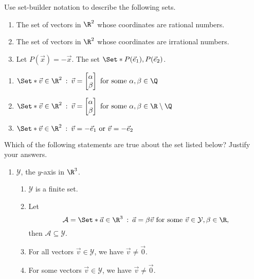 \begin{exercises}
\begin{problist}
		\prob
		Use set-builder notation to describe the following sets.
		\begin{enumerate}
			\item The set of vectors in $\R^{2}$ whose coordinates are rational numbers.

			\item The set of vectors in $\R^{2}$ whose coordinates are irrational
				numbers.

			\item Let $P(\vec x) = -\vec x$. The set $\Set*{P(\vec e_{1}), P(\vec e_{2})}$.
		\end{enumerate}
		\begin{solution}
			\begin{enumerate}
				\item $\Set*{\vec{v}\in\R^2 \given \vec{v}=\mat{\alpha\\\beta} \text{ for some } \alpha,\beta\in\Q}$
				\item $\Set*{\vec{v}\in\R^2 \given \vec{v}=\mat{\alpha\\\beta} \text{ for some } \alpha,\beta\in\R\setminus\Q}$
				\item $\Set*{\vec{v}\in\R^2 \given \vec{v}=-\vec{e}_1 \text{ or } \vec{v}=-\vec{e}_2}$
			\end{enumerate}
		\end{solution}

		\prob %
		Which of the following statements are true about the set listed below? Justify your
		answers.
		\begin{enumerate}
			\item $\mathcal{Y}$, the $y$-axis in $\R^{3}$.
				\begin{enumerate}
					\item $\mathcal{Y}$ is a finite set.

					\item Let
						\[
							\mathcal{A} = \Set*{\vec a \in \R^3 \given \vec a = \beta \vec v
										  \text{ for some } \vec v \in \mathcal{Y}, \beta \in \R},
						\]
						then $\mathcal{A} \subseteq \mathcal{Y}$.

					\item For all vectors $\vec v \in \mathcal{Y}$, we have $\vec v \neq
						\vec 0$.

					\item For some vectors $\vec v \in \mathcal{Y}$, we have $\vec v
						\neq \vec 0$.


\end{enumerate}
\end{enumerate}
\end{problist}
\end{exercises}
